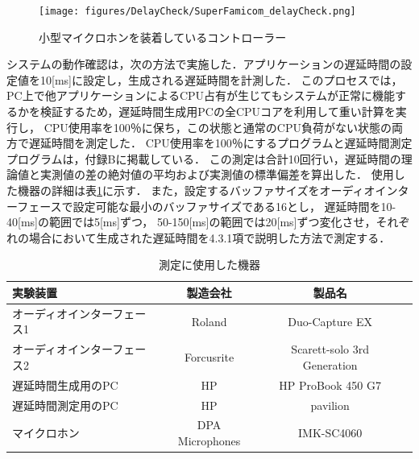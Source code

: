 \begin{figure}[bt]
  \centering
  \texttt{[image: figures/DelayCheck/SuperFamicom\_delayCheck.png]}
  \caption{小型マイクロホンを装着しているコントローラー}
  \label{fig:super_famicom}
\end{figure}
システムの動作確認は，次の方法で実施した．アプリケーションの遅延時間の設定値を10[ms]に設定し，生成される遅延時間を計測した．
このプロセスでは，PC上で他アプリケーションによるCPU占有が生じてもシステムが正常に機能するかを検証するため，遅延時間生成用PCの全CPUコアを利用して重い計算を実行し，
CPU使用率を100％に保ち，この状態と通常のCPU負荷がない状態の両方で遅延時間を測定した．
CPU使用率を100％にするプログラムと遅延時間測定プログラムは，付録Bに掲載している．
この測定は合計10回行い，遅延時間の理論値と実測値の差の絶対値の平均および実測値の標準偏差を算出した．
使用した機器の詳細は表\ref{table:device_delay_check}に示す．
また，設定するバッファサイズをオーディオインターフェースで設定可能な最小のバッファサイズである16とし，
遅延時間を10-40[ms]の範囲では5[ms]ずつ，
50-150[ms]の範囲では20[ms]ずつ変化させ，それぞれの場合において生成された遅延時間を4.3.1項で説明した方法で測定する．
\begin{table}[tbp]
  \caption{測定に使用した機器}
  \label{table:device_delay_check}
  \centering
  \begin{tabular}{lccc}
    \hline
    実験装置 & 製造会社 & 製品名\\
    \hline \hline
    オーディオインターフェース1  & Roland & Duo-Capture EX\\
    オーディオインターフェース2  & Forcusrite & Scarett-solo 3rd Generation\\
    遅延時間生成用のPC  & HP & HP ProBook 450 G7\\
    遅延時間測定用のPC  & HP & pavilion\\
    マイクロホン  & DPA Microphones & IMK-SC4060
\\
    \hline
  \end{tabular}
\end{table}

